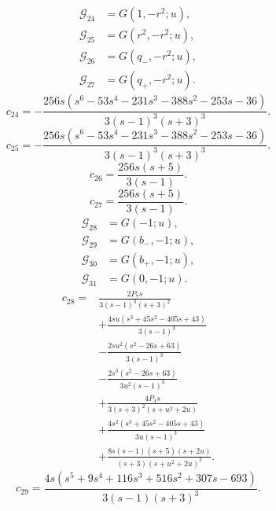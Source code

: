 \begin{align}
\mathcal G_{24}&=G(1,- r^{2};u),\\
\mathcal G_{25}&=G(r^{2},- r^{2};u),\\
\mathcal G_{26}&=G(q_{-},- r^{2};u),\\
\mathcal G_{27}&=G(q_{+},- r^{2};u).
\end{align}
\begin{equation}
c_{24}=- \frac{256 s \left(s^{6} - 53 s^{4} - 231 s^{3} - 388 s^{2} - 253 s - 36\right)}{3 \left(s - 1\right)^{3} \left(s + 3\right)^{3}}.
\end{equation}
\begin{equation}
c_{25}=- \frac{256 s \left(s^{6} - 53 s^{4} - 231 s^{3} - 388 s^{2} - 253 s - 36\right)}{3 \left(s - 1\right)^{3} \left(s + 3\right)^{3}}.
\end{equation}
\begin{equation}
c_{26}=\frac{256 s \left(s + 5\right)}{3 \left(s - 1\right)}.
\end{equation}
\begin{equation}
c_{27}=\frac{256 s \left(s + 5\right)}{3 \left(s - 1\right)}.
\end{equation}
\begin{align}
\mathcal G_{28}&=G(-1;u),\\
\mathcal G_{29}&=G(b_{-},-1;u),\\
\mathcal G_{30}&=G(b_{+},-1;u),\\
\mathcal G_{31}&=G(0,-1;u).
\end{align}
\begin{align}
c_{28}={}&\frac{2 P_{7} s}{3 \left(s - 1\right)^{3} \left(s + 3\right)^{2}}\\
&+\frac{4 s u \left(s^{3} + 45 s^{2} - 405 s + 43\right)}{3 \left(s - 1\right)^{3}}\\
&- \frac{2 s u^{2} \left(s^{2} - 26 s + 63\right)}{3 \left(s - 1\right)^{3}}\\
&- \frac{2 s^{3} \left(s^{2} - 26 s + 63\right)}{3 u^{2} \left(s - 1\right)^{3}}\\
&+\frac{4 P_{4} s}{3 \left(s + 3\right)^{2} \left(s + u^{2} + 2 u\right)}\\
&+\frac{4 s^{2} \left(s^{3} + 45 s^{2} - 405 s + 43\right)}{3 u \left(s - 1\right)^{3}}\\
&+\frac{8 s \left(s - 1\right) \left(s + 5\right) \left(s + 2 u\right)}{\left(s + 3\right) \left(s + u^{2} + 2 u\right)^{2}}.
\end{align}
\begin{equation}
c_{29}=\frac{4 s \left(s^{5} + 9 s^{4} + 116 s^{3} + 516 s^{2} + 307 s - 693\right)}{3 \left(s - 1\right) \left(s + 3\right)^{3}}.
\end{equation}
